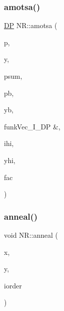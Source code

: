 \mbox{\label{namespaceNR_a2f1f661e2421d96e8602ab14e7825666}} 
\subsubsection{\texorpdfstring{amotsa()}{amotsa()}}
{\footnotesize\ttfamily \mbox{\hyperlink{namespaceNR_af6ff762dd605ff477b8e52387253a02a}{DP}} N\+R\+::amotsa (\begin{DoxyParamCaption}\item[{\mbox{\hyperlink{namespaceNR_ad1513aa4697878ed3bff0b8b3c9dd910}{Mat\+\_\+\+I\+O\+\_\+\+DP}} \&}]{p,  }\item[{\mbox{\hyperlink{namespaceNR_a970094d23441f8ef6a45282a7eb2103d}{Vec\+\_\+\+O\+\_\+\+DP}} \&}]{y,  }\item[{\mbox{\hyperlink{namespaceNR_ab293e06a6bf799d8a7ed932b6852bcb8}{Vec\+\_\+\+I\+O\+\_\+\+DP}} \&}]{psum,  }\item[{\mbox{\hyperlink{namespaceNR_a970094d23441f8ef6a45282a7eb2103d}{Vec\+\_\+\+O\+\_\+\+DP}} \&}]{pb,  }\item[{\mbox{\hyperlink{namespaceNR_af6ff762dd605ff477b8e52387253a02a}{DP}} \&}]{yb,  }\item[{\mbox{\hyperlink{namespaceNR_af6ff762dd605ff477b8e52387253a02a}{DP}} }]{funkVec\+\_\+\+I\+\_\+\+D\+P \&,  }\item[{const int}]{ihi,  }\item[{\mbox{\hyperlink{namespaceNR_af6ff762dd605ff477b8e52387253a02a}{DP}} \&}]{yhi,  }\item[{const \mbox{\hyperlink{namespaceNR_af6ff762dd605ff477b8e52387253a02a}{DP}}}]{fac }\end{DoxyParamCaption})}

\mbox{\label{namespaceNR_a65844d09b0713b4ceedf062342980ed3}} 
\subsubsection{\texorpdfstring{anneal()}{anneal()}}
{\footnotesize\ttfamily void N\+R\+::anneal (\begin{DoxyParamCaption}\item[{\mbox{\hyperlink{namespaceNR_a9f943da53862537c552e2a770cb170ae}{Vec\+\_\+\+I\+\_\+\+DP}} \&}]{x,  }\item[{\mbox{\hyperlink{namespaceNR_a9f943da53862537c552e2a770cb170ae}{Vec\+\_\+\+I\+\_\+\+DP}} \&}]{y,  }\item[{\mbox{\hyperlink{namespaceNR_a3b8558419263875cc467f92b0ef4aba7}{Vec\+\_\+\+I\+O\+\_\+\+I\+NT}} \&}]{iorder }\end{DoxyParamCaption})}

